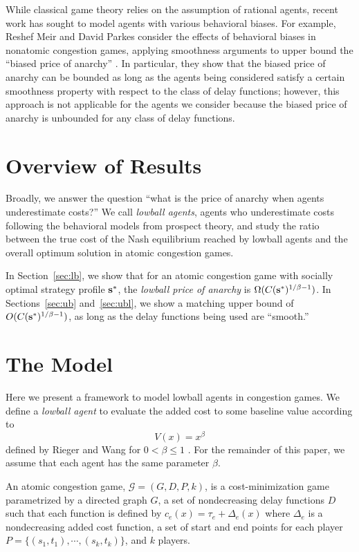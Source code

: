 \documentclass[twoside]{article}
\begin{document}
\begin{multicols}{2}
While classical game theory relies on the assumption of rational agents, recent
work has sought to model agents with various behavioral biases. For example,
Reshef Meir and David Parkes consider the effects of behavioral biases in
nonatomic congestion games, applying smoothness arguments to upper bound the
``biased price of anarchy'' \cite{Meir2014}. In particular, they show that the
biased price of anarchy can be bounded as long as the agents being considered
satisfy a certain smoothness property with respect to the class of delay
functions; however, this approach is not applicable for the agents we consider
because the biased price of anarchy is unbounded for any class of delay
functions.

\section{Overview of Results}
Broadly, we answer the question ``what is the price of anarchy when agents
underestimate costs?'' We call \textit{lowball agents}, agents who underestimate
costs following the behavioral models from prospect theory, and study the ratio between the true cost of the Nash equilibrium reached by lowball agents and the overall optimum solution in atomic congestion games.

In Section~\ref{sec:lb}, we show that for an atomic congestion game with
socially optimal strategy profile $\mathbf{s}^*$, the \textit{lowball price of anarchy} is
$\Omega(C(\mathbf{s}^*)^{1/\beta-1})$. In Sections~\ref{sec:ub} and~\ref{sec:ubl}, we
show a matching upper bound of $O(C(\mathbf{s}^*)^{1/\beta - 1})$, as long as the delay
functions being used are ``smooth.''

\section{The Model}

Here we present a framework to model lowball agents in congestion games. We define a 
\textit{lowball agent} to evaluate the added cost to some baseline value according to
\begin{equation}
  V(x) = x^{\beta}
  \label{eq:val}
\end{equation}
defined by Rieger and Wang for $0 < \beta \le 1$ \cite{Rieger2008}. For the
remainder of this paper, we assume that each agent has the same parameter
$\beta$.

An atomic congestion game, $\mathcal{G} = (G, D, P, k)$, is a cost-minimization
game parametrized by a directed graph $G$, a set of nondecreasing delay
functions $D$ such that each function is defined by $c_e(x) = \tau_e + \Delta_e(x)$ where $\Delta_e$ is a nondecreasing added cost function, a set of start and end
points for each player $P =\{(s_1, t_1), \cdots, (s_k, t_k)\}$, and $k$ players.


\end{multicols}
\end{document}
